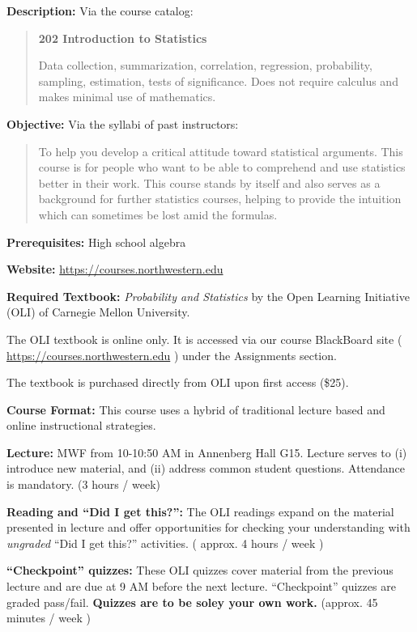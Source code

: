 \documentclass[10pt]{article}
\begin{document}
\begin{outline}

\1 {\bfseries Description:} Via the course catalog:
\begin{quote}
{\bfseries 202 Introduction to Statistics }

Data collection, summarization, correlation, regression, probability,
sampling, estimation, tests of significance. Does not require calculus
and makes minimal use of mathematics.
\end{quote}

\1 {\bfseries Objective:} Via the syllabi of past instructors: 
\begin{quote}
To help you develop a critical attitude toward statistical
arguments. This course is for people who want to be able to comprehend
and use statistics better in their work. This course stands by itself
and also serves as a background for further statistics courses,
helping to provide the intuition which can sometimes be lost amid the
formulas. 
\end{quote}

\1 {\bfseries Prerequisites:} High school algebra

\1 {\bfseries Website:} \url{https://courses.northwestern.edu}

\1 {\bfseries Required Textbook:} {\em Probability and Statistics} by
the Open Learning Initiative (OLI) of Carnegie Mellon University. 

   \2 The OLI textbook is online only. It is accessed via our course
   BlackBoard site ( \url{https://courses.northwestern.edu} ) under
   the Assignments section. 

   \2 The textbook is purchased directly from OLI upon first access
   (\$25). 

\1 {\bfseries Course Format:} This course uses a hybrid of traditional
lecture based and online instructional strategies. 

   \2 {\bfseries Lecture:} MWF from 10-10:50 AM in Annenberg Hall
   G15. Lecture serves to (i) introduce new material, and (ii) address
   common student questions. Attendance is mandatory. (3 hours / week) 

   \2 {\bfseries Reading and ``Did I get this?'':} The OLI readings
   expand on the material presented in lecture and offer
   opportunities for checking your understanding with {\em ungraded}
   ``Did I get this?'' activities. ( approx. 4 hours / week ) 

   \2 {\bfseries ``Checkpoint'' quizzes:} These OLI quizzes cover
   material from the previous lecture and are due at 9 AM before the
   next lecture. ``Checkpoint'' quizzes are graded
   pass/fail. {\bfseries Quizzes are to be soley your own work.} (approx. 45 minutes / week )


\end{outline}
\end{document}
